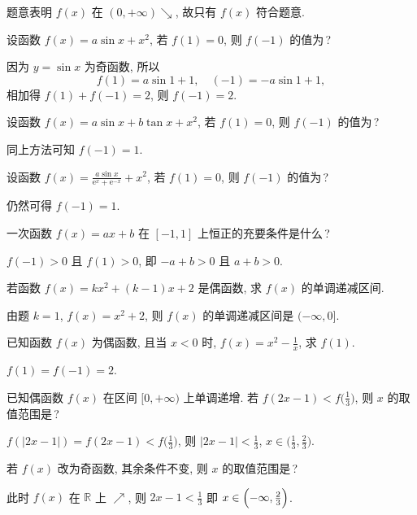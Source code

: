   \beginsolution
    题意表明 $f(x)$ 在 $(0,+\infty) \searrow$, 故只有 $f(x)$ 符合题意.
  \endsolution

  \begin{exercise}
    设函数 $f(x)= a\sin x+x^2$, 若 $f(1)=0$, 则 $f(-1)$ 的值为\,?
  \end{exercise}

  \beginsolution
    因为 $y=\sin x$ 为奇函数, 所以
    \[f(1)=a\sin1+1,\quad (-1)=-a\sin1+1,\]
    相加得 $f(1)+f(-1)=2$, 则 $f(-1)=2$.
    
    \varexercise 设函数 $f(x)= a\sin x+b\tan x+x^2$, 若 $f(1)=0$, 则 $f(-1)$ 的值为\,?
    
    同上方法可知 $f(-1)=1$.
    
    \varexercise 设函数 $f(x)= \frac{a\sin x}{\mathrm{e}^x+\mathrm{e}^{-x}}+x^2$, 若 $f(1)=0$, 则 $f(-1)$ 的值为\,?
    
    仍然可得 $f(-1)=1$.
  \endsolution
  
  \begin{exercise}
    一次函数 $f(x)=ax+b$ 在 $[-1,1]$ 上恒正的充要条件是什么\,?
  \end{exercise}

  \beginsolution
    $f(-1)>0$ 且 $f(1)>0$, 即 $-a+b>0$ 且 $a+b>0$.
  \endsolution

  \begin{exercise}
    若函数 $f(x)=kx^2+(k-1)x+2$ 是偶函数, 求 $f(x)$ 的单调递减区间.
  \end{exercise}

  \beginsolution
    由题 $k=1$, $f(x)=x^2+2$, 则 $f(x)$ 的单调递减区间是 $(-\infty,0]$.
  \endsolution
  
  \begin{exercise}
    已知函数 $f(x)$ 为偶函数, 且当 $x<0$ 时, $f(x)=x^2 -\frac1x$,
    求 $f(1)$.
  \end{exercise}

  \beginsolution
    $f(1)=f(-1)=2$.
  \endsolution
  
  \begin{exercise}
    已知偶函数 $f(x)$ 在区间 $[0,+\infty )$ 上单调递增. 
    若 $f(2x-1)<f\Big(\frac13\Big)$, 则 $x$ 的取值范围是\,?
  \end{exercise}

  \beginsolution
    $f(|2x-1|)=f(2x-1)<f\Big(\frac13\Big)$, 则 $|2x-1|<\frac13$,  $x\in\Big(\frac13,\frac23\Big)$.
    
    \varexercise 若 $f(x)$ 改为奇函数, 其余条件不变, 则 $x$ 的取值范围是\,?
    
    此时 $f(x)$ 在 $\mathbb{R}$ 上 $\nearrow$, 则 $2x-1< \frac13$ 即 $x\in\Bigl(-\infty,\frac23\Bigr)$.
  \endsolution

